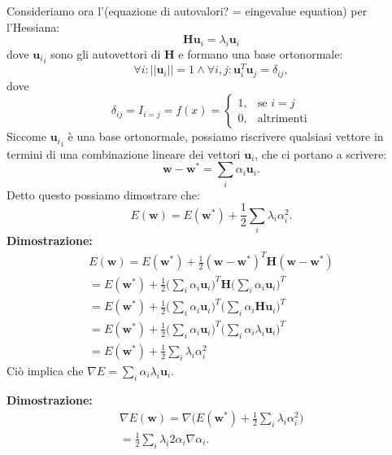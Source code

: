 Consideriamo ora l'(equazione di autovalori? = eingevalue equation) per l'Hessiana:
\begin{equation}
    \textbf{Hu}_i=\lambda_i\textbf{u}_i
\end{equation}
dove ${\textbf{u}_i}_i$ sono gli autovettori di \textbf{H} e formano una base ortonormale:
\begin{equation}
    \forall i : ||\textbf{u}_i||=1 \land \forall i,j:\textbf{u}_i^T\textbf{u}_j=\delta_{ij},
\end{equation}
dove
\begin{equation}
    \delta_{ij}=I_{i=j}=f(x)= 
    \begin{cases}
        1,& \text{se } i=j\\
        0,              & \text{altrimenti}
    \end{cases}
\end{equation}
Siccome ${\textbf{u}_{i}}_i$ è una base ortonormale, possiamo riscrivere qualsiasi vettore in termini di una combinazione lineare dei vettori $\textbf{u}_i$, che ci portano a scrivere:
\begin{equation}
    \textbf{w}-\textbf{w}^*=\sum_i\alpha_i\textbf{u}_i.
\end{equation}
Detto questo possiamo dimostrare che:
\begin{equation}
    E(\textbf{w})=E(\textbf{w}^*)+\frac{1}{2}\sum_i\lambda_i\alpha^2_i.
\end{equation}
\textbf{Dimostrazione:}
\begin{equation}
\begin{split}
  E(\textbf{w})=E(\textbf{w}^*)+\frac{1}{2}(\textbf{w}-\textbf{w}^*)^T\textbf{H}(\textbf{w}-\textbf{w}^*)\\
  =E(\textbf{w}^*)+\frac{1}{2}\Big(\sum_i\alpha_i\textbf{u}_i\Big)^T \textbf{H}\Big(\sum_i\alpha_i\textbf{u}_i \Big)^T\\
  =E(\textbf{w}^*)+\frac{1}{2}\Big(\sum_i\alpha_i\textbf{u}_i \Big)^T \Big(\sum_i\alpha_i\textbf{H} \textbf{u}_i \Big)^T\\
   =E(\textbf{w}^*)+\frac{1}{2}\Big(\sum_i\alpha_i\textbf{u}_i \Big)^T \Big(\sum_i\alpha_i\lambda_i \textbf{u}_i \Big)^T\\
   =E(\textbf{w}^*)+\frac{1}{2}\sum_i\lambda_i\alpha^2_i
\end{split}
\end{equation}
\newpage
Ciò implica che $\nabla E=\sum_i\alpha_i\lambda_i\textbf{u}_i$.



\textbf{Dimostrazione:}
\begin{equation}
\begin{split}
    \nabla E(\textbf{w})=\nabla\Big( E(\textbf{w}^*)+\frac{1}{2}\sum_i\lambda_i\alpha_i^2 \Big)\\
    =\frac{1}{2}\sum_i\lambda_i2\alpha_i\nabla\alpha_i.
\end{split}
\end{equation}

